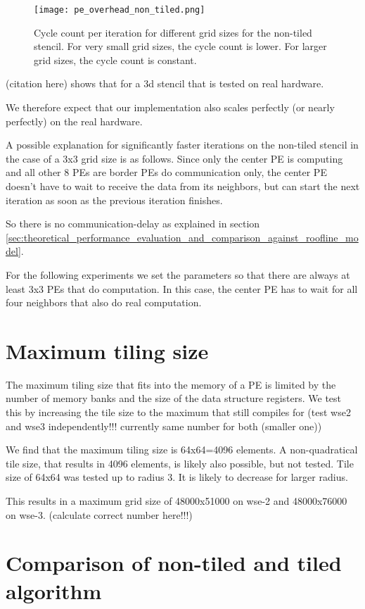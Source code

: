 \begin{figure}[h]
    \centering
    \texttt{[image: pe\_overhead\_non\_tiled.png]}
    \caption{Cycle count per iteration for different grid sizes for the non-tiled stencil. For very small grid sizes, the cycle count is lower. For larger grid sizes, the cycle count is constant.}
    \label{fig:pe_overhead}
\end{figure}

(citation here) shows that for a 3d stencil that is tested on real hardware.

We therefore expect that our implementation also scales perfectly (or nearly perfectly) on the real hardware.

A possible explanation for significantly faster iterations on the non-tiled stencil in the case of a 3x3 grid size is as follows. Since only the center PE is computing and all other 8 PEs are border PEs do communication only, the center PE doesn't have to wait to receive the data from its neighbors, but can start the next iteration as soon as the previous iteration finishes.

So there is no communication-delay as explained in section \ref{sec:theoretical_performance_evaluation_and_comparison_against_roofline_model}.

For the following experiments we set the parameters so that there are always at least 3x3 PEs that do computation. In this case, the center PE has to wait for all four neighbors that also do real computation.

\section{Maximum tiling size}
The maximum tiling size that fits into the memory of a PE is limited by the number of memory banks and the size of the data structure registers.
We test this by increasing the tile size to the maximum that still compiles for (test wse2 and wse3 independently!!! currently same number for both (smaller one))

We find that the maximum tiling size  is 64x64=4096 elements.
A non-quadratical tile size, that results in 4096 elements, is likely also possible, but not tested.
Tile size of 64x64 was tested up to radius 3. It is likely to decrease for larger radius.

This results in a maximum grid size of 48000x51000 on wse-2 and 48000x76000 on wse-3. (calculate correct number here!!!)

\section{Comparison of non-tiled and tiled algorithm}

